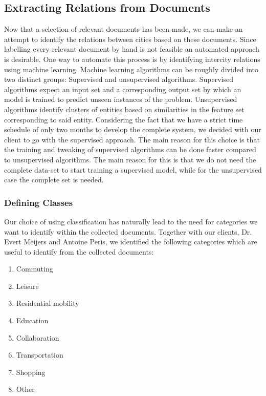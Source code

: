 \subsection{Extracting Relations from Documents}
Now that a selection of relevant documents has been made, we can make an attempt to identify the relations between cities based on these documents. Since labelling every relevant document by hand is not feasible an automated approach is desirable. 
One way to automate this process is by identifying intercity relations using machine learning. Machine learning algorithms can be roughly divided into two distinct groups: Supervised and unsupervised algorithms. Supervised algorithms expect an input set and a corresponding output set by which an model is trained to predict unseen instances of the problem. Unsupervised algorithms identify clusters of entities based on similarities in the feature set corresponding to said entity.
Considering the fact that we have a strict time schedule of only two months to develop the complete system, we decided with our client to go with the supervised approach. 
The main reason for this choice is that the training and tweaking of supervised algorithms can be done faster compared to unsupervised algorithms. The main reason for this is that we do not need the complete data-set to start training a supervised model, while for the unsupervised case the complete set is needed.

\subsubsection{Defining Classes}
Our choice of using classification has naturally lead to the need for categories we want to identify within the collected documents. Together with our clients, Dr. Evert Meijers and Antoine Peris, we identified the following categories which are useful to identify from the collected documents:\\

\begin{enumerate}
    \item Commuting
    \item Leisure
    \item Residential mobility
    \item Education
    \item Collaboration
    \item Transportation
    \item Shopping
    \item Other
\end{enumerate}

